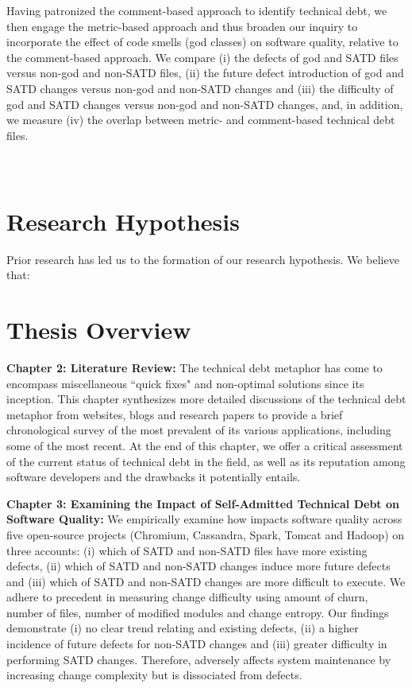 Having patronized the comment-based approach to identify technical debt, we then engage the metric-based approach and thus broaden our inquiry to incorporate the effect of code smells (god classes) on software quality, relative to the comment-based approach. We compare (i) the defects of god and SATD files versus non-god and non-SATD files, (ii) the future defect introduction of god and SATD changes versus non-god and non-SATD changes and (iii) the difficulty of god and SATD changes versus non-god and non-SATD changes, and, in addition, we measure (iv) the overlap between metric- and comment-based technical debt files.\\ \\ \\




\section{Research Hypothesis}
Prior research has led us to the formation of our research hypothesis. We believe that:


\section{Thesis Overview}

\textbf{Chapter 2: Literature Review:} The technical debt metaphor has come to encompass miscellaneous ``quick fixes" and non-optimal solutions since its inception.  This chapter synthesizes more detailed discussions of the technical debt metaphor from websites, blogs and research papers to provide a brief chronological survey of the most prevalent of its various applications, including some of the most recent.  At the end of this chapter, we offer a critical assessment of the current status of technical debt in the field, as well as its reputation among software developers and the drawbacks it potentially entails.

\textbf{Chapter 3: Examining the Impact of Self-Admitted Technical Debt on Software Quality:} We empirically examine how \SATD impacts software quality across five open-source projects (Chromium, Cassandra, Spark, Tomcat and Hadoop) on three accounts: (i) which of SATD and non-SATD files have more existing defects, (ii) which of SATD and non-SATD changes induce more future defects and (iii) which of SATD and non-SATD changes are more difficult to execute. We adhere to precedent in measuring change difficulty using amount of churn, number of files, number of modified modules and change entropy. Our findings demonstrate (i) no clear trend relating \SATD and existing defects, (ii) a higher incidence of future defects for non-SATD changes and (iii) greater difficulty in performing SATD changes. Therefore, \SATD adversely affects system maintenance by increasing change complexity but is dissociated from defects.

